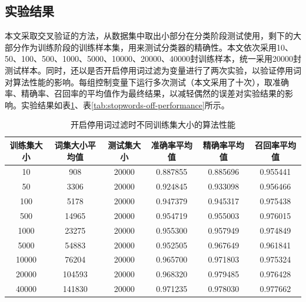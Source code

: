 \documentclass[UTF8,zihao=-4]{ctexart}
\begin{document}
\subsection{实验结果}	
	本文采取交叉验证的方法，从数据集中取出小部分在分类阶段测试使用，剩下的大部分作为训练阶段的训练样本集，用来测试分类器的精确性。本文依次采用10、50、100、500、1000、5000、10000、20000、40000封训练样本，统一采用20000封测试样本。同时，还以是否开启停用词过滤为变量进行了两次实验，以验证停用词对算法性能的影响。每组控制变量下运行多次测试（本文采用了十次），取准确率、精确率、召回率的平均值作为最终结果，以减轻偶然的误差对实验结果的影响。实验结果如表\ref{tab:stopwords-on-performance}、表\ref{tab:stopwords-off-performance}所示。
	
	\begin{table}[H]
		\centering
		\caption{开启停用词过滤时不同训练集大小的算法性能}
		\label{tab:stopwords-on-performance}
		\begin{tabular}{|c|c|c|c|c|c|}
			\hline
			训练集大小&词集大小平均值&测试集大小&准确率平均值&精确率平均值&召回率平均值\\
			\hline
			10&908&20000&0.887855&0.885696&0.955441\\
			\hline
			50&3306&20000&0.924845&0.933098&0.956466\\
			\hline
			100&5178&20000&0.947379&0.945317&0.975438\\
			\hline
			500&14965&20000&0.954719&0.955003&0.976015\\
			\hline
			1000&23275&20000&0.955300&0.957949&0.974849\\
			\hline
			5000&54883&20000&0.952505&0.967649&0.961841\\
			\hline
			10000&76204&20000&0.965700&0.971803&0.975324\\
			\hline
			20000&104593&20000&0.968320&0.979485&0.976428\\
			\hline
			40000&141830&20000&0.971235&0.978030&0.977662\\
			\hline
		\end{tabular}
	\end{table}
\end{document}
